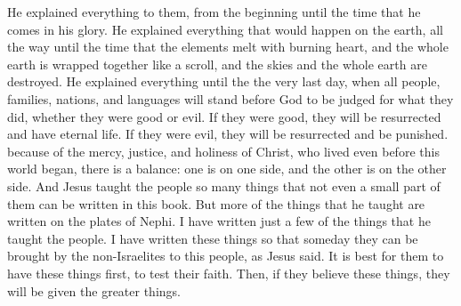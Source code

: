 He explained everything to them, from the beginning until the time that he comes in his glory. He explained everything that would happen on the earth, all the way until the time that the elements melt with burning heart, and the whole earth is wrapped together like a scroll, and the skies and the whole earth are destroyed.
\bverse \iffalse And even unto the great and last day, when all people, and all kindreds, and all nations and tongues shall stand before God, to be judged of their works, whether they be good or whether they be evil-- \fi
He explained everything until the the very last day, when all people, families, nations, and languages will stand before God to be judged for what they did, whether they were good or evil.
\bverse \iffalse If they be good, to the resurrection of everlasting life; and if they be evil, to the resurrection of damnation; being on a parallel, the one on the one hand and the other on the other hand, according to the mercy, and the justice, and the holiness which is in Christ, who was before the world began. \fi
If they were good, they will be resurrected and have eternal life. If they were evil, they will be resurrected and be punished. because of the mercy, justice, and holiness of Christ, who lived even before this world began, there is a balance: one is on one side, and the other is on the other side.
\bverse \iffalse And now there cannot be written in this book even a hundredth part of the things which Jesus did truly teach unto the people; \fi
And Jesus taught the people so many things that not even a small part of them can be written in this book.
\bverse \iffalse But behold the plates of Nephi do contain the more part of the things which he taught the people. \fi
But more of the things that he taught are written on the plates of Nephi.
\bverse \iffalse And these things have I written, which are a lesser part of the things which he taught the people; and I have written them to the intent that they may be brought again unto this people, from the Gentiles, according to the words which Jesus hath spoken. \fi
I have written just a few of the things that he taught the people. I have written these things so that someday they can be brought by the non-Israelites to this people, as Jesus said.
\bverse \iffalse And when they shall have received this, which is expedient that they should have first, to try their faith, and if it shall so be that they shall believe these things then shall the greater things be made manifest unto them. \fi
It is best for them to have these things first, to test their faith. Then, if they believe these things, they will be given the greater things.
